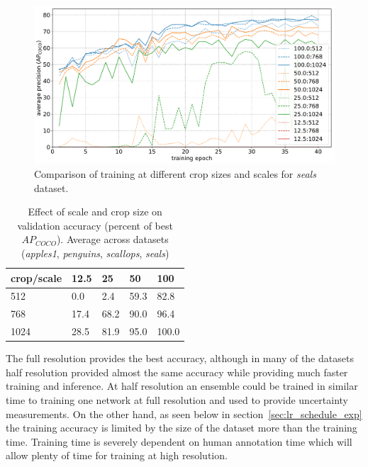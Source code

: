  
\begin{figure}[h]
  \centering
  \includegraphics[width=1.0\linewidth]{charts/training/crops_scales/seals.pdf}
  \caption{Comparison of training at different crop sizes and scales for \emph{seals} dataset. }  
  \label{fig:seals_crop_scale}
\end{figure}


\begin{table}[ht]
  \centering
    \caption{Effect of scale and crop size on validation accuracy (percent of best $AP_{COCO}$). Average across datasets (\emph{apples1}, \emph{penguins}, \emph{scallops}, \emph{seals}) }

  \begin{tabular}{ l | l l l l}
    crop/scale & 12.5 & 25 & 50 & 100 \\
    \toprule
        512   & 0.0  & 2.4  &  59.3  & 82.8 \\
        768   & 17.4 & 68.2  &  90.0 &  96.4 \\
        1024  & 28.5 & 81.9  &  95.0  & 100.0 \\
    \bottomrule
  \end{tabular}
\label{tab:accuracy_scale_crop}
\end{table}


The full resolution provides the best accuracy, although in many of the datasets half resolution provided almost the same accuracy while providing much faster training and inference. At half resolution an ensemble could be trained in similar time to training one network at full resolution and used to provide uncertainty measurements. On the other hand, as seen below in section~\ref{sec:lr_schedule_exp} the training accuracy is limited by the size of the dataset more than the training time. Training time is severely dependent on human annotation time which will allow plenty of time for training at high resolution.

